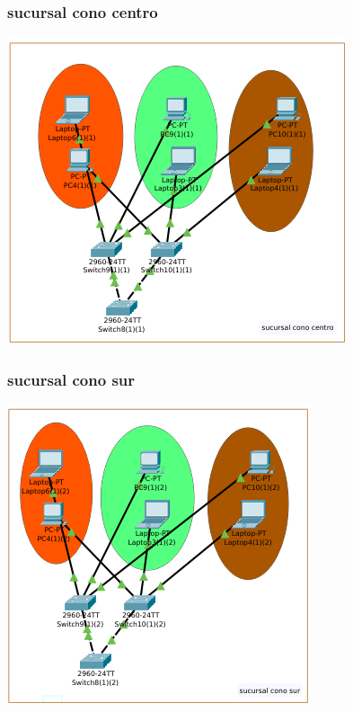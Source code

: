 \subsubsection{sucursal cono centro}
\includegraphics[scale=1]{img/conocentro.png} 
 \subsubsection{sucursal cono sur}
 \includegraphics[scale=1]{img/conosur.png} 

